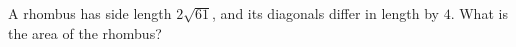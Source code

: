 A rhombus has side length $2\sqrt{61}$, and its diagonals differ in length by $4$. What is the area of the rhombus?
